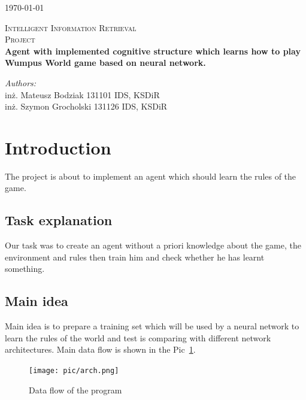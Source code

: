 \documentclass[a4paper]{article}
\begin{document}
\begin{flushright}
{\large \today}
\end{flushright}

\begin{center}



\textsc{\LARGE Intelligent Information Retrieval }\\[1.5cm]

\textsc{\Large Project }\\[0.5cm]

{ \huge \bfseries Agent with implemented cognitive structure which learns how to play Wumpus World game based on neural network. \\[0.4cm] }


\end{center}
\begin{minipage}{0.7\textwidth}
\begin{flushleft} \large
\emph{Authors:}\\
inż. Mateusz Bodziak 131101 IDS, KSDiR\\
inż. Szymon Grocholski 131126 IDS, KSDiR\\

\end{flushleft}
\end{minipage}

\section{Introduction}
The project is about to implement an agent which should learn the rules of the game. 
	\subsection{Task explanation}
	Our task was to create an agent without a priori knowledge about the game, the 
	environment and rules then train him and check whether he has learnt something.
	\subsection{Main idea}
	Main idea is to prepare a training set which will be used by a neural network to learn
	 the rules of the world and test is comparing with different network architectures.
	 Main data flow is shown in the Pic~\ref{pic:flow}.
	 \begin{figure}[!h]
		\centering	
		\texttt{[image: pic/arch.png]}
		\caption{Data flow of the program }
		\label{pic:flow}
	\end{figure}
\end{document}
